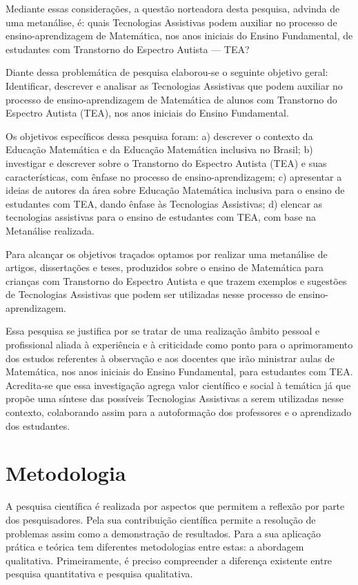 \documentclass[portuguese]{textolivre}
\begin{document}
Mediante essas considerações, a questão norteadora desta pesquisa,
advinda de uma metanálise, é: quais Tecnologias Assistivas podem
auxiliar no processo de ensino-aprendizagem de Matemática, nos anos
iniciais do Ensino Fundamental, de estudantes com Transtorno do Espectro
Autista --- TEA?

Diante dessa problemática de pesquisa elaborou-se o seguinte objetivo
geral: Identificar, descrever e analisar as Tecnologias Assistivas que
podem auxiliar no processo de ensino-aprendizagem de Matemática de
alunos com Transtorno do Espectro Autista (TEA), nos anos iniciais do
Ensino Fundamental.

Os objetivos específicos dessa pesquisa foram: a) descrever o contexto
da Educação Matemática e da Educação Matemática inclusiva no Brasil; b)
investigar e descrever sobre o Transtorno do Espectro Autista (TEA) e
suas características, com ênfase no processo de ensino-aprendizagem; c)
apresentar a ideias de autores da área sobre Educação Matemática
inclusiva para o ensino de estudantes com TEA, dando ênfase às
Tecnologias Assistivas; d) elencar as tecnologias assistivas para o
ensino de estudantes com TEA, com base na Metanálise realizada.

Para alcançar os objetivos traçados optamos por realizar uma metanálise
de artigos, dissertações e teses, produzidos sobre o ensino de
Matemática para crianças com Transtorno do Espectro Autista e que trazem
exemplos e sugestões de Tecnologias Assistivas que podem ser utilizadas
nesse processo de ensino-aprendizagem.

Essa pesquisa se justifica por se tratar
de uma realização âmbito pessoal e profissional aliada à experiência e à
criticidade como ponto para o aprimoramento dos estudos referentes à
observação e aos docentes que irão ministrar aulas de Matemática, nos
anos iniciais do Ensino Fundamental, para estudantes com TEA.
Acredita-se que essa investigação agrega valor científico e social à
temática já que propõe uma síntese das possíveis Tecnologias Assistivas
a serem utilizadas nesse contexto, colaborando assim para a autoformação
dos professores e o aprendizado dos estudantes.



\section{Metodologia}
A pesquisa científica é realizada por aspectos que permitem a reflexão
por parte dos pesquisadores. Pela sua contribuição científica permite a
resolução de problemas assim como a demonstração de resultados. Para a
sua aplicação prática e teórica tem diferentes metodologias entre estas:
a abordagem qualitativa. Primeiramente, é preciso compreender a
diferença existente entre pesquisa quantitativa e pesquisa qualitativa.
\end{document}
